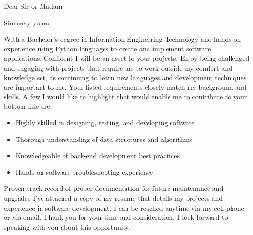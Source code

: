 \documentclass{subfiles}
\begin{document}
\clearpage
{} %
\date{\today} %
\opening{Dear Sir or Madam,} %
\closing{Sincerely yours,} %

\makelettertitle %
With a Bachelor’s degree in Information Engineering Technology and hands-on experience using Python languages to create and implement software applications, Confident I will be an asset to your projects.
\newline
Enjoy being challenged and engaging with projects that require me to work outside my comfort and knowledge set, as continuing to learn new languages and development techniques are important to me.
\newline
Your listed requirements closely match my background and skills. A few I would like to highlight that would enable me to contribute to your bottom line are:
\begin{itemize}
  \item Highly skilled in designing, testing, and developing software
  \item Thorough understanding of data structures and algorithms
  \item Knowledgeable of back-end development best practices
  \item Hands-on software troubleshooting experience
\end{itemize}

Proven track record of proper documentation for future maintenance and upgrades
I’ve attached a copy of my resume that details my projects and experience in software development. I can be reached anytime via my cell phone or via email.
\newline
Thank you for your time and consideration. I look forward to speaking with you about this opportunity.

\makeletterclosing %

\newpage
\end{document}
